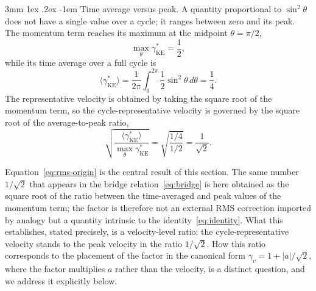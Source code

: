 \documentclass[%
 reprint, amsmath,amssymb, aps, prb, ]{revtex4-2}
\makeatletter
\numberwithin{equation}{section}
\renewcommand\paragraph{%
  \@startsection{paragraph}{4}{\z@}%
    {3mm \@plus 1ex \@minus .2ex}%
    {-1em}%
    {\normalfont\normalsize\itshape}}
\newcommand{\gKE}{\gamma^{*}_{\text{KE}}}
\makeatother
\begin{document}
\paragraph{Time average versus peak.}
A quantity proportional to $\sin^2\theta$ does not have a single value over a cycle; it ranges between zero and its peak. The momentum term reaches its maximum at the midpoint $\theta=\pi/2$,
\begin{equation}
\max_\theta \gKE = \frac{1}{2},
\label{eq:peak}
\end{equation}
while its time average over a full cycle is
\begin{equation}
\langle \gKE \rangle = \frac{1}{2\pi}\int_0^{2\pi}\frac{1}{2}\sin^2\theta\,d\theta = \frac{1}{4}.
\label{eq:average}
\end{equation}
The representative velocity is obtained by taking the square root of the momentum term, so the cycle-representative velocity is governed by the square root of the average-to-peak ratio,
\begin{equation}
\sqrt{\frac{\langle \gKE \rangle}{\max_\theta \gKE}} = \sqrt{\frac{1/4}{1/2}} = \frac{1}{\sqrt{2}}.
\label{eq:rms-origin}
\end{equation}

Equation~\eqref{eq:rms-origin} is the central result of this section. The same number $1/\sqrt{2}$ that appears in the bridge relation~\eqref{eq:bridge} is here obtained as the square root of the ratio between the time-averaged and peak values of the momentum term; the factor is therefore not an external RMS correction imported by analogy but a quantity intrinsic to the identity~\eqref{eq:identity}. What this establishes, stated precisely, is a velocity-level ratio: the cycle-representative velocity stands to the peak velocity in the ratio $1/\sqrt{2}$. How this ratio corresponds to the placement of the factor in the canonical form $\gamma_v = 1 + \lvert a\rvert/\sqrt{2}$, where the factor multiplies $a$ rather than the velocity, is a distinct question, and we address it explicitly below.
\end{document}
